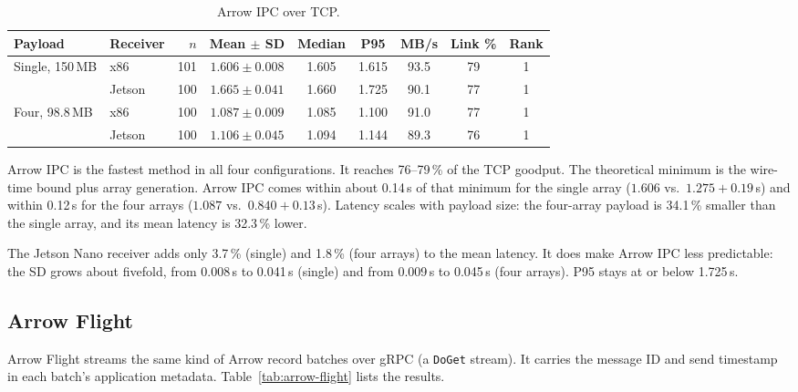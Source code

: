 \begin{table}[t]
  \centering
  \caption{Arrow IPC over TCP.}
  \label{tab:arrow-ipc}
  \small
  \setlength{\tabcolsep}{4pt}
  \begin{tabular}{llrcccccc}
    \toprule
    Payload & Receiver & $n$ & Mean $\pm$ SD & Median & P95 & MB/s & Link \% & Rank \\
    \midrule
    Single, 150\,MB & x86    & 101 & $1.606 \pm 0.008$ & 1.605 & 1.615 & 93.5 & 79 & 1 \\
                    & Jetson & 100 & $1.665 \pm 0.041$ & 1.660 & 1.725 & 90.1 & 77 & 1 \\
    \addlinespace
    Four, 98.8\,MB  & x86    & 100 & $1.087 \pm 0.009$ & 1.085 & 1.100 & 91.0 & 77 & 1 \\
                    & Jetson & 100 & $1.106 \pm 0.045$ & 1.094 & 1.144 & 89.3 & 76 & 1 \\
    \bottomrule
  \end{tabular}
\end{table}

Arrow IPC is the fastest method in all four configurations. It reaches 76--79\,\% of
the TCP goodput. The theoretical minimum is the wire-time bound plus array
generation. Arrow IPC comes within about 0.14\,s of that minimum for the single array
($1.606$ vs.\ $1.275 + 0.19$\,s) and within 0.12\,s for the four arrays ($1.087$
vs.\ $0.840 + 0.13$\,s). Latency scales with payload size: the four-array payload is
34.1\,\% smaller than the single array, and its mean latency is 32.3\,\% lower.

The Jetson Nano receiver adds only 3.7\,\% (single) and 1.8\,\% (four arrays) to the
mean latency. It does make Arrow IPC less predictable: the SD grows about fivefold,
from 0.008\,s to 0.041\,s (single) and from 0.009\,s to 0.045\,s (four arrays). P95
stays at or below 1.725\,s.

\subsection{Arrow Flight}
\label{sec:res-arrow-flight}

Arrow Flight streams the same kind of Arrow record batches over gRPC (a \texttt{DoGet}
stream). It carries the message ID and send timestamp in each batch's application
metadata. Table~\ref{tab:arrow-flight} lists the results.

